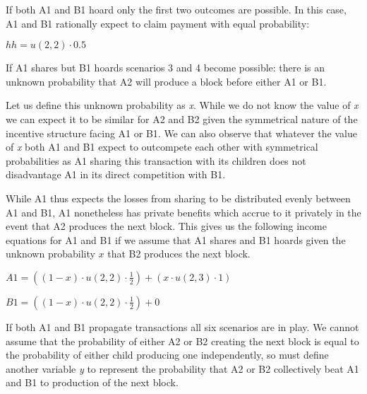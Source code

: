\documentclass[oneside]{article}   	%
\begin{document}
\begin{multicols}{2}
If both A1 and B1 hoard only the first two outcomes are possible. In this case, A1 and B1 rationally expect to claim payment with equal probability:

\large
\begin{adjustwidth}{1.5em}{1.5em} 
	\begin{math}
h h = u(2, 2) \cdot 0.5
	\end{math}
\end{adjustwidth}
\normalsize

If A1 shares but B1 hoards scenarios 3 and 4 become possible: there is an unknown probability that A2 will produce a block before either A1 or B1.

Let us define this unknown probability as \textit{x}. While we do not know the value of \textit{x} we can expect it to be similar for A2 and B2 given the symmetrical nature of the incentive structure facing A1 or B1. We can also observe that whatever the value of \textit{x} both A1 and B1 expect to outcompete each other with symmetrical probabilities as A1 sharing this transaction with its children does not disadvantage A1 in its direct competition with B1.

While A1 thus expects the losses from sharing to be distributed evenly between A1 and B1, A1 nonetheless has private benefits which accrue to it privately in the event that A2 produces the next block. This gives us the following income equations for A1 and B1 if we assume that A1 shares and B1 hoards given the unknown probability \begin{math}x\end{math} that B2 produces the next block.

\normalsize
\begin{adjustwidth}{1.5em}{1.5em} 
	\begin{math}
A1 = \left( (1 - x)\cdot u(2, 2) \cdot \frac{1}{2} \right) + \left( x\cdot u(2,3) \cdot 1 \right)
	\end{math}

	\begin{math}
B1 = \left( (1 - x)\cdot u(2, 2) \cdot \frac{1}{2} \right) + 0
	\end{math}
\end{adjustwidth}
\normalsize

If both A1 and B1 propagate transactions all six scenarios are in play. We cannot assume that the probability of either A2 or B2 creating the next block is equal to the probability of either child producing one independently, so must define another variable \textit{y} to represent the probability that A2 or B2 collectively beat A1 and B1 to production of the next block.


\end{multicols}
\end{document}
